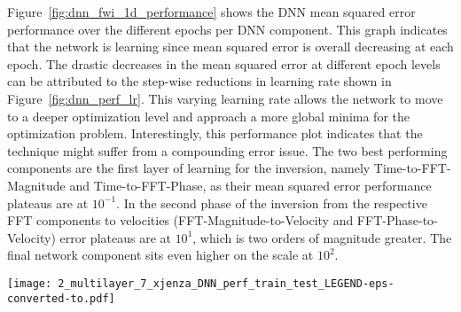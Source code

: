 Figure~\ref{fig:dnn_fwi_1d_performance} shows the DNN mean squared error performance over the different epochs per DNN component. This graph indicates that the network is learning since mean squared error is overall decreasing at each epoch. The drastic decreases in the mean squared error at different epoch levels can be attributed to the step-wise reductions in learning rate shown in Figure~\ref{fig:dnn_perf_lr}. This varying learning rate allows the network to move to a deeper optimization level and approach a more global minima for the optimization problem. Interestingly, this performance plot indicates that the technique might suffer from a compounding error issue. The two best performing components are the first layer of learning for the inversion, namely Time-to-FFT-Magnitude and Time-to-FFT-Phase, as their mean squared error performance plateaus are at $10^{-1}$. In the second phase of the inversion from the respective FFT components to velocities (FFT-Magnitude-to-Velocity and FFT-Phase-to-Velocity) error plateaus are at $10^1$, which is two orders of magnitude greater. The final network component sits even higher on the scale at $10^2$.

\clearpage
\begin{figure*}[ht!]
    \centering
    \texttt{[image: 2\_multilayer\_7\_xjenza\_DNN\_perf\_train\_test\_LEGEND-eps-converted-to.pdf]}
    \hfill
    \hspace{10pt}
    
    \caption{DNN training performance metrics.}
    \label{fig:dnn_fwi_1d_performance}
\end{figure*}

